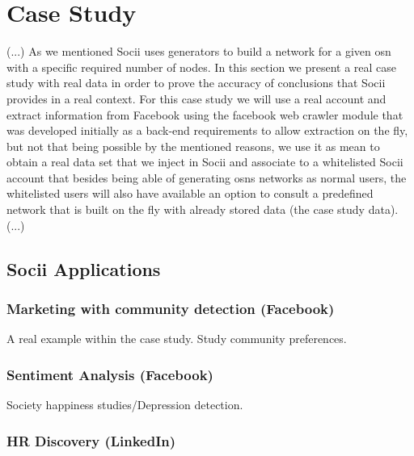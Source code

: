 \section{Case Study}
(...)
As we mentioned Socii uses generators to build a network for a given \gls{osn} with a specific required number of nodes. In this section we present
a real case study with real data in order to prove the accuracy of conclusions that Socii provides in a real context. For this case study we will use
a real account and extract information from Facebook using the facebook web crawler module that was developed initially as a back-end requirements to allow extraction on the fly, but not that being possible by the mentioned reasons, we use it as mean to obtain a real data set that we inject in Socii and associate to a whitelisted Socii account that besides being able of generating \glspl{osn} networks as normal users, the whitelisted users will also have available an option to consult a predefined network that is built on the fly with already stored data (the case study data).
(...)

\subsection{Socii Applications}


\subsubsection{Marketing with community detection (Facebook)}
A real example within the case study. Study community preferences.

\subsubsection{Sentiment Analysis (Facebook)}
Society happiness studies/Depression detection.

\subsubsection{HR Discovery (LinkedIn)}
